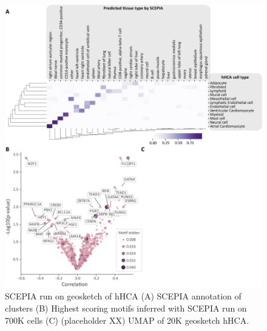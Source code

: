 \begin{figure}
    \centering
    \includegraphics[width=\linewidth]{ch.scepia/imgs/SCEPIAGEOSKETCH_AllCells20000_Suppfig_v2.png}
    \caption{SCEPIA run on geosketch of hHCA (A) SCEPIA annotation of clusters (B) Highest scoring motifs inferred with SCEPIA run on 700K cells (C) (placeholder XX) UMAP of 20K geosketch hHCA. }
    \label{fig:geoscepia_results}
\end{figure}

